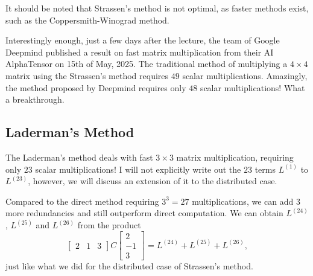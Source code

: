 \begin{remark}
    It should be noted that Strassen's method is not optimal, as faster methods exist, such as the Coppersmith-Winograd method.
\end{remark}

\begin{remark}
    Interestingly enough, just a few days after the lecture, the team of Google Deepmind published a result on fast matrix multiplication from their AI AlphaTensor on 15th of May, 2025. The traditional method of multiplying a $4\times4$ matrix using the Strassen's method requires $49$ scalar multiplications. Amazingly, the method proposed by Deepmind requires only $48$ scalar multiplications! What a breakthrough.
\end{remark}

\subsection{Laderman's Method}
The Laderman's method \cite{Laderman3x3} deals with fast $3\times 3$ matrix multiplication, requiring only $23$ scalar multiplications! I will not explicitly write out the $23$ terms $L^{(1)}$ to $L^{(23)}$, however, we will discuss an extension of it to the distributed case.

Compared to the direct method requiring $3^3=27$ multiplications, we can add $3$ more redundancies and still outperform direct computation. We can obtain $L^{(24)}$, $L^{(25)}$ and $L^{(26)}$ from the product
\begin{equation}
    \left[\begin{matrix}
        2 & 1 & 3
    \end{matrix}\right] C \left[\begin{matrix}
        2 \\ -1 \\ 3
    \end{matrix}\right] = L^{(24)} + L^{(25)} + L^{(26)},
\end{equation}
just like what we did for the distributed case of Strassen's method.